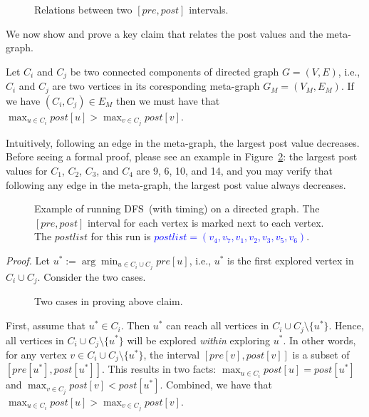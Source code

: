 \begin{figure}[h!]
\centering{}
\caption{Relations between two $[pre,post]$ intervals.}
\label{fig:interval}
\end{figure}

We now show and prove a key claim that relates the post values and the meta-graph.

\begin{claim}
Let $C_i$ and $C_j$ be two connected components of directed graph $G = (V, E)$, i.e., $C_i$ and $C_j$ are two
vertices in its coresponding meta-graph $G_M = (V_M, E_M)$. If we have $(C_i, C_j) \in E_M$ then
we must have that $\max_{u\in C_i} post[u] > \max_{v\in C_j} post[v]$.
\end{claim}

Intuitively, following an edge in the meta-graph, the largest post value decreases.
Before seeing a formal proof, please see an example in Figure~\ref{fig:dfs}:
the largest post values for $C_1$, $C_2$, $C_3$, and $C_4$ are 9, 6, 10, and 14,
and you may verify that following any edge in the meta-graph, the largest post value always decreases.

\begin{figure}[h!]
\centering{}
\caption{Example of running DFS~(with timing) on a directed graph. The $[pre,post]$ interval for each vertex
is marked next to each vertex.  The $postlist$ for this run is \textcolor{blue}{$postlist = (v_4,v_7,v_1,v_2,v_3,v_5,v_6)$}.  }
\label{fig:dfs}
\end{figure}



\emph{Proof.} Let $u^* := \arg\min_{u\in C_i\cup C_j} pre[u]$, i.e., $u^*$ is the first explored vertex in $C_i\cup C_j$.
Consider the two cases. 

\begin{figure}[h!]
\centering{}
\caption{Two cases in proving above claim.}
\label{fig:meta}
\end{figure}

First, assume that $u^* \in C_i$. Then $u^*$ can reach all vertices in $C_i\cup C_j\setminus \{u^*\}$.
Hence, all vertices in $C_i\cup C_j\setminus \{u^*\}$ will be explored \emph{within} exploring $u^*$.
In other words, for any vertex $v\in C_i\cup C_j\setminus \{u^*\}$, the interval $[pre[v], post[v]]$
is a subset of $[pre[u^*], post[u^*]]$. This results in two facts:
$\max_{u\in C_i} post[u] = post[u^*]$ and $\max_{v\in C_j} post[v] < post[u^*]$.
Combined, we have that $\max_{u\in C_i} post[u] > \max_{v\in C_j} post[v]$.

